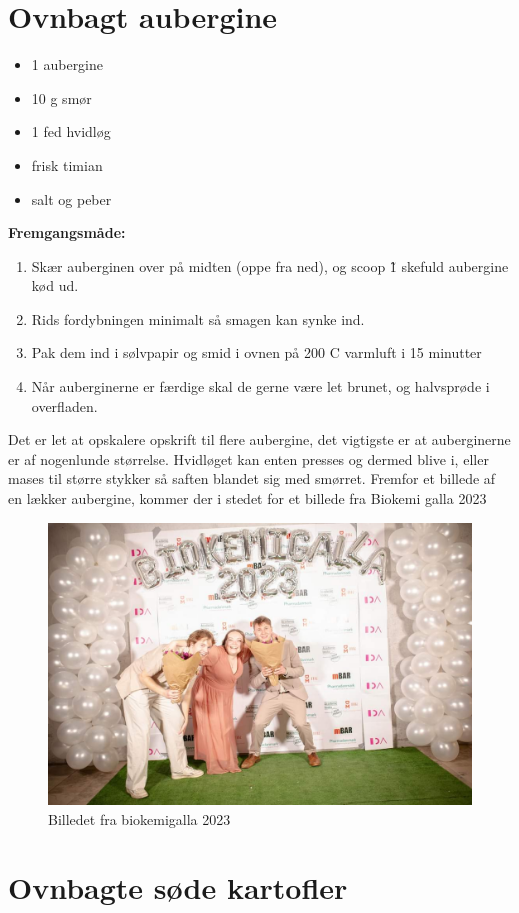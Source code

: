 \documentclass{book}
\begin{document}
\section{Ovnbagt aubergine}
\begin{minipage}[t]{0.5\textwidth}
\begin{itemize}
    \item 1 aubergine
    \item 10 g smør
    \item 1 fed hvidløg
    \item frisk timian
    \item salt og peber
\end{itemize}
\end{minipage}
\begin{minipage}[t]{0.5\textwidth}
\textbf{Fremgangsmåde:}
\begin{enumerate}
    \item Skær auberginen over på midten (oppe fra ned), og scoop \~ 1 skefuld aubergine kød ud.
    \item Rids fordybningen minimalt så smagen kan synke ind.
    \item Pak dem ind i sølvpapir og smid i ovnen på 200 \degree C varmluft i 15 minutter
    \item Når auberginerne er færdige skal de gerne være let brunet, og halvsprøde i overfladen.
\end{enumerate}
\end{minipage}
Det er let at opskalere opskrift til flere aubergine, det vigtigste er at auberginerne er af nogenlunde størrelse. Hvidløget kan enten presses og dermed blive i, eller mases til større stykker så saften blandet sig med smørret.
\newpage 
Fremfor et billede af en lækker aubergine, kommer der i stedet for et billede fra Biokemi galla 2023
\begin{figure}
    \centering
    \includegraphics[width=0.5\linewidth]{Galla.jpg}
    \caption{Billedet fra biokemigalla 2023}
\end{figure}
\newpage \section{Ovnbagte søde kartofler}
\end{document}
